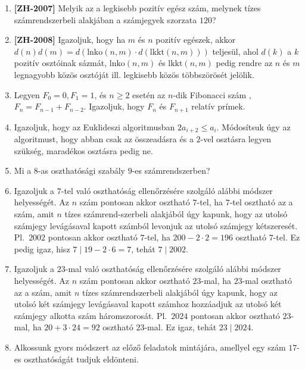 \documentclass[a4paper, 12pt]{article}
\begin{document}
\begin{enumerate}
	\item \textbf{[ZH-2007]} Melyik az a legkisebb pozitív egész szám, melynek tízes számrendszerbeli alakjában a számjegyek szorzata $120$?
	\item \textbf{[ZH-2008]} Igazoljuk, hogy ha $m$ és $n$ pozitív egészek, akkor $d(n)d(m)=d(\text{lnko}(n,m) \cdot d(\text{lkkt}(n,m)))$ teljesül, ahol $d(k)$ a $k$ pozitív osztóinak sázmát, $\text{lnko}(n,m)$ és $\text{lkkt}(n,m)$ pedig rendre az $n$ és $m$ legnagyobb közös osztóját ill. legkisebb közös többszörösét jelölik.
	\item Legyen $F_0=0, F_1=1$, és $n\ge 2$ esetén az $n$-dik Fibonacci szám ,$F_n=F_{n-1}+F_{n-2}$. Igazoljuk, hogy $F_n$ és $F_{n+1}$ relatív prímek.
	\item Igazoljuk, hogy az Euklideszi algoritmusban $2a_{i+2}\le a_i$. Módosítsuk úgy az algoritmust, hogy abban csak az összeadásra és a  $2$-vel osztásra legyen szükség, maradékos osztásra pedig ne.
	\item Mi a $8$-as oszthatósági szabály $9$-es számrendszerben?
	\item Igazoljuk a $7$-tel való oszthatóság ellenőrzésére szolgáló alábbi módszer helyességét. Az $n$ szám pontosan akkor osztható $7$-tel, ha $7$-tel
osztható az a szám, amit $n$ tízes számrend-szerbeli alakjából úgy kapunk, hogy az utolsó számjegy levágásaval kapott számból levonjuk az utolsó számjegy kétszeresét. Pl.\ $2002$ pontosan akkor osztható $7$-tel, ha $200-2\cdot 2=196$ osztható $7$-tel. Ez pedig igaz, hisz $7\mid 19-2\cdot 6=7$, tehát $7\mid 2002$.
  \item Igazoljuk a $23$-mal való oszthatóság ellenőrzésére szolgáló alábbi módszer helyességét. Az $n$ szám pontosan akkor osztható $23$-mal, ha $23$-mal osztható az a szám, amit $n$ tízes számrendszerbeli alakjából úgy kapunk, hogy az utolsó két számjegy levágásaval kapott számhoz hozzáadjuk az utolsó
két számjegy alkotta szám háromszorosát. Pl.\ $2024$ pontosan akkor osztható $23$-mal, ha $20+3\cdot 24=92$ osztható $23$-mal. Ez igaz, tehát $23\mid
2024$.
	\item Alkossunk gyors módszert az előző feladatok mintájára, amellyel egy szám $17$-es oszthatóságát tudjuk eldönteni.

\end{enumerate}
\end{document}
